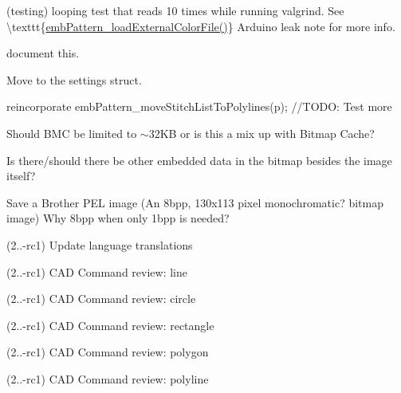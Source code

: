 \begin{DoxyRefList}
\label{todo__todo000211}%
%
(testing) looping test that reads 10 times while running valgrind. See \textbackslash{}texttt\{\mbox{\hyperlink{embroidery_8h_a3bf191bd99e2da8d36465f454a4646f6}{emb\+Pattern\+\_\+load\+External\+Color\+File()}}\} Arduino leak note for more info. 
\item[Member \mbox{\hyperlink{embroidermodder_8h_a59b98c3061d780d55cc048bcce8b47d0}{Index}} ]\label{todo__todo000002}%
%
document this.  
\item[Member \mbox{\hyperlink{utility_8cpp_a3e6926ae65525832ed3c1ba9d8df636e}{just\+\_\+opened}} ]\label{todo__todo000012}%
%
Move to the settings struct.  
\item[Member \mbox{\hyperlink{class_mdi_window_a8437f8fd71bcf6da5de2a49cbd0b105b}{Mdi\+Window\+::load\+File}} (const QString \&file\+Name)]\label{todo__todo000003}%
%
reincorporate emb\+Pattern\+\_\+move\+Stitch\+List\+To\+Polylines(p); //\+TODO\+: Test more  
\item[Member \mbox{\hyperlink{class_mdi_window_a2167cf71975c040208ae05b7b6b10a2f}{Mdi\+Window\+::save\+BMC}} ()]\label{todo__todo000005}%
%
Should BMC be limited to $\sim$32\+KB or is this a mix up with Bitmap Cache? 



Is there/should there be other embedded data in the bitmap besides the image itself? 

\label{todo__todo000004}%
%
Save a Brother PEL image (An 8bpp, 130x113 pixel monochromatic? bitmap image) Why 8bpp when only 1bpp is needed? 
\item[page \mbox{\hyperlink{index}{Overview}} ]\label{todo__todo000046}%
%
(2..-\/rc1) Update language translations

\label{todo__todo000047}%
%
(2..-\/rc1) CAD Command review\+: line

\label{todo__todo000048}%
%
(2..-\/rc1) CAD Command review\+: circle

\label{todo__todo000049}%
%
(2..-\/rc1) CAD Command review\+: rectangle

\label{todo__todo000050}%
%
(2..-\/rc1) CAD Command review\+: polygon

\label{todo__todo000051}%
%
(2..-\/rc1) CAD Command review\+: polyline


\end{DoxyRefList}
